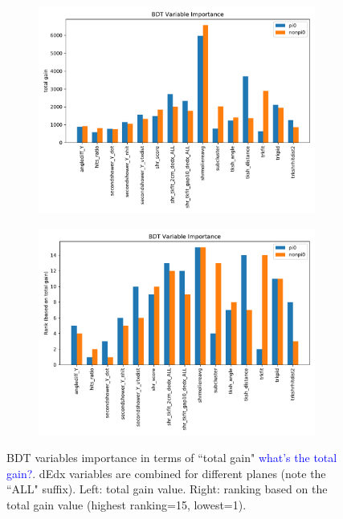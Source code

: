 \documentclass[a4paper]{article}
\begin{document}
\begin{figure}[H] 
\begin{center}
    \begin{subfigure}[b]{0.45\textwidth}
    \centering
    \includegraphics[width=1.00\textwidth]{1eNp/bdt_var_gain.pdf}
    \caption{\label{fig:1eNp:bdt:var:gain}}
    \end{subfigure}
    \begin{subfigure}[b]{0.45\textwidth}
    \centering
    \includegraphics[width=1.00\textwidth]{1eNp/bdt_var_rank.pdf}
    \caption{\label{fig:1eNp:bdt:var:rank}}
    \end{subfigure}
\caption{\label{ffig:1eNp:bdt:var} BDT variables importance in terms of ``total gain" \textcolor{blue}{what's the total gain?}. dEdx variables are combined for different planes (note the ``ALL" suffix). Left: total gain value. Right: ranking based on the total gain value (highest ranking=15, lowest=1).}
\end{center}
\end{figure}
\end{document}
